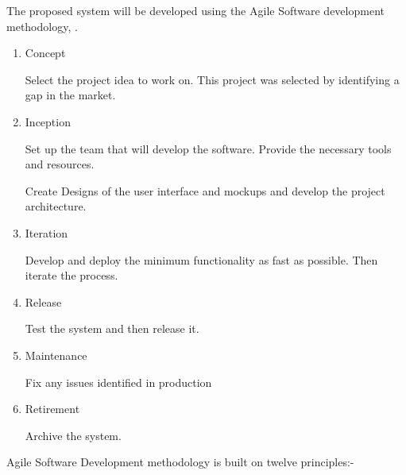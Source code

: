 
The proposed system will be developed using the Agile Software development methodology, \citep{agilemanifesto}.

\begin{enumerate}
      \item Concept


            Select the project idea to work on. This project was selected by identifying a gap in the market.

      \item Inception


            Set up the team that will develop the software. Provide the necessary tools and resources.

            Create Designs of the user interface and mockups and develop the project architecture.

      \item Iteration


            Develop and deploy the minimum functionality as fast as possible. Then iterate the process.

      \item Release

            Test the system and then release it.

      \item Maintenance

            Fix any issues identified in production

      \item Retirement

            Archive the system.
\end{enumerate}

Agile Software Development methodology is built on twelve principles:-

